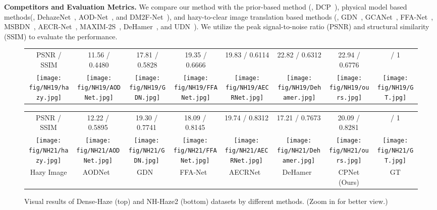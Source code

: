 \textbf{Competitors and Evaluation Metrics.} We compare our method with the prior-based method (\eg, DCP~\cite{he2010single}), physical model based methods(\eg, DehazeNet~\cite{cai2016dehazenet}, AOD-Net~\cite{li2017aod}, and DM2F-Net~\cite{Deng2019}), and hazy-to-clear image translation based methods (\eg, GDN~\cite{liu2019griddehazenet}, GCANet~\cite{chen2019gated}, FFA-Net~\cite{qin2020ffa}, MSBDN~\cite{dong2020multi}, AECR-Net~\cite{wu2021contrastive}, MAXIM-2S~\cite{tu2022maxim}, DeHamer~\cite{guo2022image}, and UDN~\cite{hong2022uncertainty}). We utilize the peak signal-to-noise ratio (PSNR) and structural similarity (SSIM) to evaluate the performance.
\begin{figure*}[t]
	\centering
	\setlength{\abovecaptionskip}{0cm}
	\setlength{\fboxrule}{1pt}
	\setlength{\fboxsep}{0pt}
	\setlength{\tabcolsep}{0.05em}	
	\begin{tabular}{cccccccc}
		PSNR / SSIM& 11.56 / 0.4480  &17.81 / 0.5828 & 19.35 / 0.6666 & 19.83 / 0.6114 & 22.82 / 0.6312 & 22.94 / 0.6776 &  / 1 \\	   		
		\texttt{[image: fig/NH19/hazy.jpg]} &
		\texttt{[image: fig/NH19/AODNet.jpg]} &
		\texttt{[image: fig/NH19/GDN.jpg]} &
		\texttt{[image: fig/NH19/FFANet.jpg]} &
		\texttt{[image: fig/NH19/AECRNet.jpg]} &
		\texttt{[image: fig/NH19/Dehamer.jpg]} &
		\texttt{[image: fig/NH19/ours.jpg]}&
		\texttt{[image: fig/NH19/GT.jpg]}\\			
\end{tabular}	
	\label{fig:NH19}
	
	\centering
	\setlength{\tabcolsep}{0.05em}	
	\begin{tabular}{cccccccc}
		PSNR / SSIM& 12.22 / 0.5895  &19.30 / 0.7741 & 18.09 / 0.8145 & 19.74 / 0.8312 & 17.21 / 0.7673 & 20.09 / 0.8281 &  / 1 \\	   		
		\texttt{[image: fig/NH21/hazy.jpg]} &
		\texttt{[image: fig/NH21/AODNet.jpg]} &
		\texttt{[image: fig/NH21/GDN.jpg]} &
		\texttt{[image: fig/NH21/FFANet.jpg]} &
		\texttt{[image: fig/NH21/AECRNet.jpg]} &
		\texttt{[image: fig/NH21/Dehamer.jpg]} &
		\texttt{[image: fig/NH21/ours.jpg]}&
		\texttt{[image: fig/NH21/GT.jpg]}\\			
		Hazy Image &AODNet~\cite{li2017aod}&GDN~\cite{liu2019griddehazenet}&FFA-Net~\cite{qin2020ffa}&AECRNet~\cite{wu2021contrastive}&DeHamer~\cite{guo2022image}&CPNet (Ours)&GT
	\end{tabular}	
	\caption{Visual results of Dense-Haze (top) and NH-Haze2 (bottom) datasets by different methods. (Zoom in for better view.)}\vspace{-2mm}
	\label{fig:NH21}
\end{figure*}

